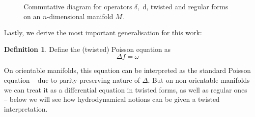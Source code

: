 \documentclass[11pt,twoside]{article}
\theoremstyle{definition}
\newtheorem{Def}[theorem]{Definition}
\numberwithin{equation}{section}
\begin{document}
\begin{figure}


    \caption{Commutative diagram for operators $\delta,$ d, twisted and regular forms on an $n$-dimensional manifold $M$.}
    \label{fig: operators and forms}
\end{figure}


Lastly, we derive the most important generalisation for this work:
\begin{Def}
Define the (twisted) Poisson equation as 
\begin{equation}
    \label{eq: twisted Poisson}
    \Delta f = \omega
\end{equation}
\end{Def}
On orientable manifolds, this equation can be interpreted as the standard Poisson equation -- due to parity-preserving nature of $\Delta$. But on non-orientable manifolds we can treat it as a differential equation in twisted forms, as well as regular ones -- below we will see how hydrodynamical notions can be given a twisted interpretation. 
\end{document}
